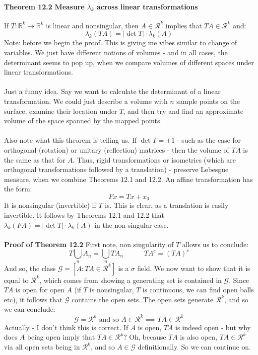 \documentclass[12pt,a4paper]{article}
\newcommand{\1}[1]{\mathbbm{1}\left\{ #1 \right\}}
\newcommand{\R}{\mathbb{R}}
\newcommand{\rcal}{\mathcal{R}}
\newcommand{\gcal}{\mathcal{G}}
\begin{document}
\paragraph{Theorem 12.2 Measure $\lambda_k$ across linear transformations} If $T: \R^k \to \R^k$ is linear and nonsingular, then $A \in \rcal^k$ implies that $TA \in \rcal^k$ and:
$$
	\lambda_k(TA) = \left|\det T\right| \cdot \lambda_k(A)
$$
Note: before we begin the proof. This is giving me vibes similar to change of variables. We just have different notions of volumes - and in all cases, the determinant seems to pop up, when we compare volumes of different spaces under linear transformations.
\\\\
Just a funny idea. Say we want to calculate the determinant of a linear transformation. We could just describe a volume with $n$ sample points on the surface, examine their location under $T$, and then try and find an approximate volume of the space spanned by the mapped points.  
\\\\
Also note what this theorem is telling us. If $\det T = \pm 1$ - such as the case for orthogonal (rotation) or unitary (reflection) matrices - then the volume of $TA$ is the same as that for $A$. Thus, rigid transformations or isometries (which are orthogonal transformations followed by a translation) - preserve Lebesgue measure, when we combine Theorems 12.1 and 12.2. An affine transformation has the form:
$$
	Fx = Tx + x_0
$$
It is nonsingular (invertible) if $T$ is. This is clear, as a translation is easily invertible. It follows by Theorems 12.1 and 12.2 that $\lambda_k(FA) = \left|\det T\right| \cdot \lambda_k(A)$ in the non singular case.
\\\\
\textbf{Proof of Theorem 12.2} First note, non singularity of $T$ allows us to conclude:
$$
	T\bigcup_n A_n = \bigcup_n T A_n \quad\quad\quad
	TA^c = (TA)^c
$$
And so, the class $\gcal = \left[A : TA \in \rcal^k\right]$ is a $\sigma$ field. We now want to show that it is equal to $\rcal^k$, which comes from showing a generating set is contained in $\gcal$. Since $TA$ is open for open $A$ (if $T$ is nonsingular, $T$ is continuous, we can find open balls etc), it follows that $\gcal$ contains the open sets. 
The open sets generate $\rcal^k$, and so we can conclude:
$$
	\gcal = \rcal^k \text{ and so } A \in \rcal^k \implies TA \in \rcal^k
$$
Actually - I don't think this is correct. If $A$ is open, $TA$ is indeed open - but why does $A$ being open imply that $TA \in \rcal^k$? Oh, because $TA$ is also open, $TA \in \rcal^k$ via all open sets being in $\rcal^k$, and so $A \in \gcal$ definitionally. So we can continue on.
\end{document}
